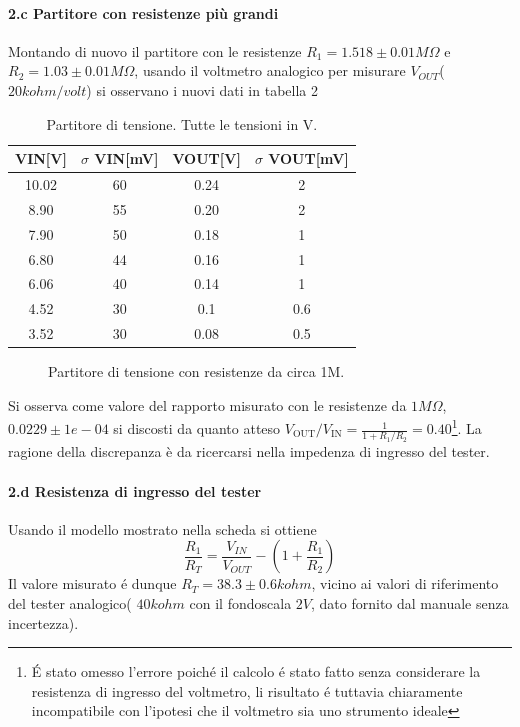 \documentclass[10pt,a4paper]{article}
\begin{document}
\paragraph{2.c Partitore con resistenze pi\`u grandi}
Montando di nuovo il partitore con le resistenze $R_1 = 1.518\pm 0.01 M\Omega$ e $R_2 = 1.03\pm 0.01 M\Omega$, usando il voltmetro analogico per misurare $V_{OUT}$($20 kohm/volt$) si osservano i nuovi dati in tabella 2
\begin{table}[h]
\centering
\begin{tabular}{|c|c|c|c|}
\hline 
VIN[V]& $\sigma$ VIN[mV] & VOUT[V]	 & $\sigma$ VOUT[mV] \\
\hline 
10.02 & 60 & 0.24 & 2 \\
8.90 & 55 & 0.20 & 2 \\
7.90 & 50 & 0.18 & 1 \\
6.80 & 44 & 0.16 & 1 \\
6.06 & 40 & 0.14 & 1 \\
4.52 & 30 & 0.1 & 0.6 \\
3.52 & 30 & 0.08 & 0.5 \\
\hline 
\end{tabular} 
\caption{Partitore di tensione. Tutte le tensioni in V.\label{t:par2}}
\end{table}
\begin{figure}
\centering
\caption{Partitore di tensione con resistenze da circa 1M.\label{f:par2}}
\end{figure}

Si osserva come valore del rapporto misurato con le resistenze da $1 M\Omega$, $0.0229 \pm 1e-04$ si discosti da quanto atteso   $V_\mathrm{OUT}/V_\mathrm{IN} = \frac{1}{1+R_1/R_2}= 0.40 $\footnote{\'E stato omesso l'errore poich\'e il calcolo \'e stato fatto senza considerare la resistenza di ingresso del voltmetro, li risultato \'e tuttavia chiaramente incompatibile con l'ipotesi che il voltmetro sia uno strumento ideale}. La ragione della discrepanza \`e da ricercarsi nella impedenza di ingresso del tester.


\paragraph{2.d Resistenza di ingresso del tester}

 Usando il modello mostrato nella scheda si ottiene
\[ \frac{R_1}{R_T} =  \frac{V_{IN}}{V_{OUT}} - (1 +  \frac{R_1}{R_2} )
\]
Il valore misurato \'e dunque $R_T=38.3 \pm 0.6 kohm$, vicino ai valori di riferimento del tester analogico( $40 kohm$ con il fondoscala $2 V$, dato fornito dal manuale senza incertezza).
\end{document}
